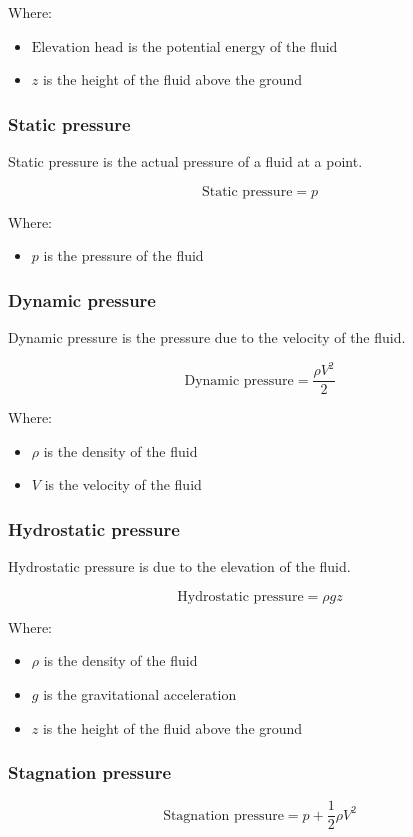 \documentclass[11pt]{article}
\begin{document}
Where:
\begin{itemize}
\item \(\text{Elevation head}\) is the potential energy of the fluid
\item \(z\) is the height of the fluid above the ground
\end{itemize}

\subsubsection{Static pressure}
\label{sec:orgb7de69d}
Static pressure is the actual pressure of a fluid at a point.

\[\text{Static pressure} = p\]

Where:
\begin{itemize}
\item \(p\) is the pressure of the fluid
\end{itemize}

\subsubsection{Dynamic pressure}
\label{sec:org594315a}
Dynamic pressure is the pressure due to the velocity of the fluid.

\[\text{Dynamic pressure} = \frac{\rho V^2}{2}\]

Where:
\begin{itemize}
\item \(\rho\) is the density of the fluid
\item \(V\) is the velocity of the fluid
\end{itemize}

\subsubsection{Hydrostatic pressure}
\label{sec:orgf902e53}
Hydrostatic pressure is due to the elevation of the fluid.

\[\text{Hydrostatic pressure} = \rho g z\]

Where:
\begin{itemize}
\item \(\rho\) is the density of the fluid
\item \(g\) is the gravitational acceleration
\item \(z\) is the height of the fluid above the ground
\end{itemize}

\subsubsection{Stagnation pressure}
\label{sec:orgdf917f3}
\[\text{Stagnation pressure} = p + \frac{1}{2} \rho V^2\]
\end{document}
